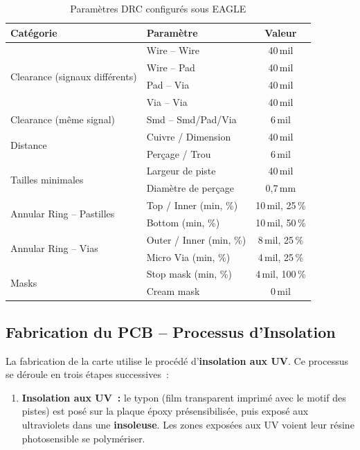 \documentclass[a4paper,12pt,openany]{book}
\begin{document}
\begin{enumerate}
	\begin{table}[H]
		\centering
		\caption{Paramètres DRC configurés sous EAGLE}
		\label{tab:drc}
		\renewcommand{\arraystretch}{1.3}
		\begin{tabular}{|l|l|c|}
			\hline
			\textbf{Catégorie} & \textbf{Paramètre} & \textbf{Valeur} \\
			\hline
			\multirow{4}{*}{Clearance (signaux différents)} 
			& Wire -- Wire   & 40\,mil \\
			& Wire -- Pad    & 40\,mil \\
			& Pad -- Via     & 40\,mil \\
			& Via -- Via     & 40\,mil \\
			\hline
			Clearance (même signal) 
			& Smd -- Smd/Pad/Via & 6\,mil \\
			\hline
			\multirow{2}{*}{Distance}
			& Cuivre / Dimension & 40\,mil \\
			& Perçage / Trou     & 6\,mil \\
			\hline
			\multirow{2}{*}{Tailles minimales}
			& Largeur de piste   & 40\,mil \\
			& Diamètre de perçage & 0{,}7\,mm \\
			\hline
			\multirow{2}{*}{Annular Ring -- Pastilles}
			& Top / Inner (min, \%) & 10\,mil, 25\,\% \\
			& Bottom (min, \%)      & 10\,mil, 50\,\% \\
			\hline
			\multirow{2}{*}{Annular Ring -- Vias}
			& Outer / Inner (min, \%) & 8\,mil, 25\,\% \\
			& Micro Via (min, \%)     & 4\,mil, 25\,\% \\
			\hline
			\multirow{2}{*}{Masks}
			& Stop mask (min, \%) & 4\,mil, 100\,\% \\
			& Cream mask          & 0\,mil \\
			\hline
		\end{tabular}
	\end{table}
	
	
	
\subsection{Fabrication du PCB -- Processus d'Insolation}

La fabrication de la carte utilise le proc\'ed\'e d'\textbf{insolation
	aux UV}. Ce processus se d\'eroule en trois \'etapes successives~:

\begin{enumerate}
	\item \textbf{Insolation aux UV~:} le typon (film transparent
	imprim\'e avec le motif des pistes) est pos\'e sur la plaque
	\'epoxy pr\'esensibilis\'ee, puis expos\'e aux ultraviolets dans
	une \textbf{insoleuse}. Les zones expos\'ees aux UV voient leur
	r\'esine photosensible se polym\'eriser.
	

\end{enumerate}
\end{enumerate}
\end{document}
